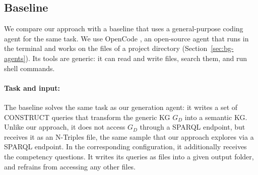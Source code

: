 



\subsection{Baseline}\label{sec:approach-baseline}
We compare our approach with a baseline that uses a general-purpose coding agent for the same task. We use OpenCode \citep{opencode}, an open-source agent that runs in the terminal and works on the files of a project directory (Section~\ref{sec:bg-agents}). Its tools are generic: it can read and write files, search them, and run shell commands.

\paragraph{Task and input:}
The baseline solves the same task as our generation agent: it writes a set of CONSTRUCT queries that transform the generic KG \(G_D\) into a semantic KG. Unlike our approach, it does not access \(G_D\) through a SPARQL endpoint, but receives it as an N-Triples file, the same sample that our approach explores via a SPARQL endpoint. In the corresponding configuration, it additionally receives the competency questions. It writes its queries as files into a given output folder, and refrains from accessing any other files.

